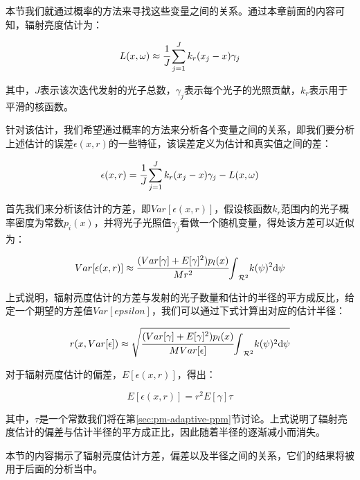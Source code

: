 本节我们就通过概率的方法来寻找这些变量之间的关系。通过本章前面的内容可知，辐射亮度估计为：

\begin{equation}\label{e:pm-pixel-value}
	L(x,\omega)\approx \cfrac{1}{J}\sum^{J}_{j=1}k_r(x_j-x)\gamma_j
\end{equation}

其中，$J$表示该次迭代发射的光子总数，$\gamma_j$表示每个光子的光照贡献，$k_r$表示用于平滑的核函数。

针对该估计，我们希望通过概率的方法来分析各个变量之间的关系，即我们要分析上述估计的误差$\epsilon(x,r)$的一些特征，该误差定义为估计和真实值之间的差：

\begin{equation}\label{e:pm-ppm-error}
	\epsilon(x,r)= \cfrac{1}{J}\sum^{J}_{j=1}k_r(x_j-x)\gamma_j-L(x,\omega)
\end{equation}

首先我们来分析该估计的方差，即$Var[\epsilon (x,r)]$，假设核函数$k_r$范围内的光子概率密度为常数$p_i(x)$，并将光子光照值$\gamma_j$看做一个随机变量，\cite{a:ProgressivePhotonMappingAProbabilisticApproach}得处该方差可以近似为：

\begin{equation}
	Var[\epsilon(x,r)]\approx \cfrac{(Var[\gamma]+E[\gamma]^{2})p_l(x)}{Mr^{2}}{\rm \int}_{\mathcal{R}^{2}}k(\psi)^{2}{\rm d}\psi
\end{equation}

上式说明，辐射亮度估计的方差与发射的光子数量和估计的半径的平方成反比，给定一个期望的方差值$Var[epsilon]$，我们可以通过下式计算出对应的估计半径：

\begin{equation}
	r(x,Var[\epsilon])\approx\sqrt{ \cfrac{(Var[\gamma]+E[\gamma]^{2})p_l(x)}{MVar[\epsilon]}{\rm \int}_{\mathcal{R}^{2}}k(\psi)^{2}{\rm d}\psi}
\end{equation}

对于辐射亮度估计的偏差，$E[\epsilon (x,r)]$，\cite{a:ProgressivePhotonMappingAProbabilisticApproach}得出：

\begin{equation}
	E[\epsilon (x,r)]=r^{2}E[\gamma]\tau
\end{equation}

其中，$\tau$是一个常数我们将在第\ref{sec:pm-adaptive-ppm}节讨论。上式说明了辐射亮度估计的偏差与估计半径的平方成正比，因此随着半径的逐渐减小而消失。

本节的内容揭示了辐射亮度估计方差，偏差以及半径之间的关系，它们的结果将被用于后面的分析当中。



